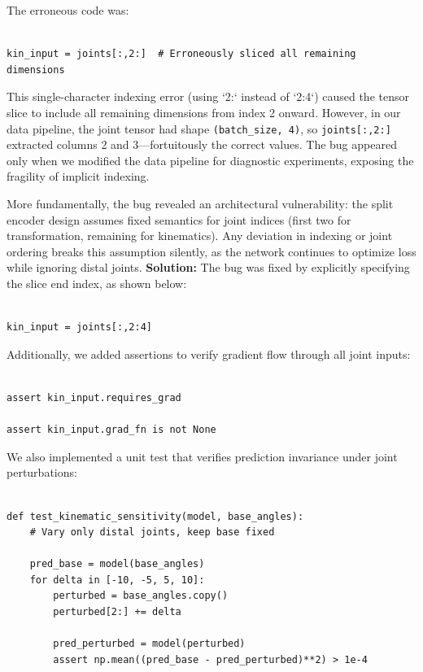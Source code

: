 \documentclass[12pt,a4paper,oneside]{report}
\begin{document}
The erroneous code was:
\begin{verbatim}

kin_input = joints[:,2:]  # Erroneously sliced all remaining dimensions

\end{verbatim}

This single-character indexing error (using `2:` instead of `2:4`) caused the tensor slice to include all remaining dimensions from index 2 onward. However, in our data pipeline, the joint tensor had shape \texttt{(batch\_size, 4)}, so \texttt{joints[:,2:]} extracted columns 2 and 3---fortuitously the correct values. The bug appeared only when we modified the data pipeline for diagnostic experiments, exposing the fragility of implicit indexing.

More fundamentally, the bug revealed an architectural vulnerability: the split encoder design assumes fixed semantics for joint indices (first two for transformation, remaining for kinematics). Any deviation in indexing or joint ordering breaks this assumption silently, as the network continues to optimize loss while ignoring distal joints.
\textbf{Solution:} The bug was fixed by explicitly specifying the slice end index, as shown below:
\begin{verbatim}

kin_input = joints[:,2:4]
\end{verbatim}

Additionally, we added assertions to verify gradient flow through all joint inputs:
\begin{verbatim}

assert kin_input.requires_grad

assert kin_input.grad_fn is not None

\end{verbatim}

We also implemented a unit test that verifies prediction invariance under joint perturbations:
{\footnotesize

\begin{verbatim}

def test_kinematic_sensitivity(model, base_angles):
    # Vary only distal joints, keep base fixed

    pred_base = model(base_angles)
    for delta in [-10, -5, 5, 10]:
        perturbed = base_angles.copy()
        perturbed[2:] += delta

        pred_perturbed = model(perturbed)
        assert np.mean((pred_base - pred_perturbed)**2) > 1e-4

\end{verbatim}
}
\end{document}
